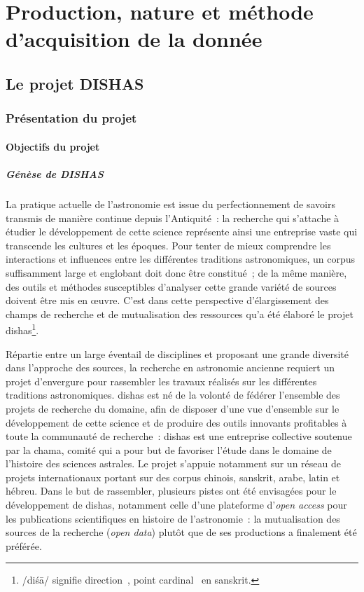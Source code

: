 \documentclass[a4paper,12pt,twoside]{book}
\newcommand{\eng}{\emph}
\newcommand{\g}[1]{\og#1~\fg}
\newcommand{\dishas}{\gls{dishas}\xspace}
\newcommand{\chama}{\gls{chama}\xspace}
\begin{document}
\thispagestyle{empty}
\cleardoublepage

\mainmatter

\part{Production, nature et méthode d'acquisition de la donnée}

\chapter{Le projet DISHAS}
	\section{Présentation du projet}
		\subsection{Objectifs du projet}
			\subsubsection{Génèse de DISHAS}
La pratique actuelle de l'astronomie est issue du perfectionnement de savoirs transmis de manière continue depuis l'Antiquité~: la recherche qui s'attache à étudier le développement de cette science représente ainsi une entreprise vaste qui transcende les cultures et les époques. Pour tenter de mieux comprendre les interactions et influences entre les différentes traditions astronomiques, un corpus suffisamment large et englobant doit donc être constitué~; de la même manière, des outils et méthodes susceptibles d'analyser cette grande variété de sources doivent être mis en œuvre. C'est dans cette perspective d'élargissement des champs de recherche et de mutualisation des ressources qu'a été élaboré le projet \dishas\footnote{/diśā/ signifie \g{direction}, \g{point cardinal} en sanskrit.}.

Répartie entre un large éventail de disciplines et proposant une grande diversité dans l'approche des sources, la recherche en astronomie ancienne requiert un projet d'envergure pour rassembler les travaux réalisés sur les différentes traditions astronomiques. \dishas est né de la volonté de fédérer l'ensemble des projets de recherche du domaine, afin de disposer d'une vue d'ensemble sur le développement de cette science et de produire des outils innovants profitables à toute la communauté de recherche~: \dishas est une entreprise collective soutenue par la \chama, comité qui a pour but de favoriser l'étude dans le domaine de l'histoire des sciences astrales. Le projet s'appuie notamment sur un réseau de projets internationaux portant sur des corpus chinois, sanskrit, arabe, latin et hébreu. Dans le but de rassembler, plusieurs pistes ont été envisagées pour le développement de \dishas, notamment celle d'une plateforme d'\eng{open access} pour les publications scientifiques en histoire de l'astronomie~: la mutualisation des sources de la recherche (\eng{open data}) plutôt que de ses productions a finalement été préférée.
\end{document}
